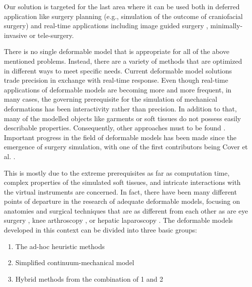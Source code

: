 Our solution is targeted for the last area where it can be used both in deferred application like surgery planning (e.g., simulation of the 
outcome of craniofacial surgery) \cite{bro1995modelling, keeve1996craniofacial} and real-time applications 
including image guided surgery \cite{Szekely2000}, minimally-invasive or tele-surgery. 


There is no single deformable model that is appropriate for all of the above mentioned 
problems. Instead, there are a variety of methods that are optimized in different ways to meet specific 
needs. 
Current deformable model solutions trade precision in exchange with real-time response.
Even though real-time applications of deformable models are becoming more and more frequent, 
in many cases, the governing prerequisite for the simulation of 
mechanical deformations has been interactivity rather than precision. In addition to that, many of the modelled objects like garments or soft 
tissues do not possess easily describable properties. Consequently, other approaches must to be found 
\cite{bro1998finite}. Important progress in the field of deformable models has been made since the emergence of surgery 
simulation, with one of the first contributors being Cover et al. \cite{cover1993interactively}. 


This is mostly due to the extreme prerequisites 
as far as computation time, complex properties of the simulated soft tissues, and intricate interactions with the virtual instruments are concerned. 
In fact, there have been many different points of departure in the research of adequate deformable models, focusing on anatomies and surgical techniques 
that are as different from each other as are eye surgery \cite{cai2001parametric, sagar1994virtual}, knee arthroscopy \cite{gibson1997simulating, 
hoffman1998commercially}, or hepatic laparoscopy \cite{cotin1999real}. The deformable models developed in this context can be divided into three basic groups: 

\begin{enumerate}
 \item The ad-hoc heuristic methods
 \item Simplified continuum-mechanical model
 \item Hybrid methods from the combination of 1 and 2
\end{enumerate}



